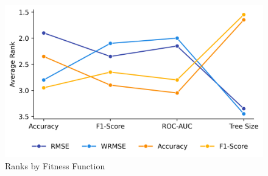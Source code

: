 
    \begin{figure}[h]
    \centering
    \includegraphics[width=\linewidth]{../Latex/Chapters/Figures/Results/fitness_ranks.png}
    \caption{Ranks by Fitness Function}
    \label{fig:ranks}
    \end{figure}
    